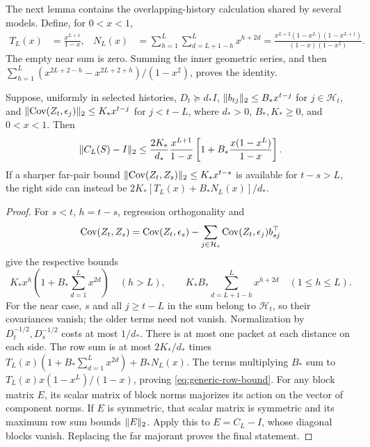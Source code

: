 The next lemma contains the overlapping-history calculation shared by
several models. Define, for $0<x<1$,
\begin{align}
 T_L(x)&=\frac{x^{L+1}}{1-x},&
 N_L(x)&=\sum_{h=1}^L\sum_{d=L+1-h}^L x^{h+2d}
 =\frac{x^{L+2}(1-x^L)(1-x^{L+1})}{(1-x)(1-x^2)}.
 \label{eq:tail-near}
\end{align}
The empty near sum is zero. Summing the inner geometric series, and then
$\sum_{h=1}^L(x^{2L+2-h}-x^{2L+2+h})/(1-x^2)$, proves the identity.

\begin{lemma}
\label{lem:local-row}
Suppose, uniformly in selected histories,
$D_t\succeq d_* I$, $\lVert b_{tj}\rVert_2\le B_*x^{t-j}$ for
$j\in\mathcal H_t$, and
$\lVert\operatorname{Cov}(Z_t,\epsilon_j)\rVert_2\le K_*x^{t-j}$ for $j<t-L$,
where $d_*>0$, $B_*,K_*\ge0$, and $0<x<1$. Then
\begin{equation}
 \lVert C_L(S)-I\rVert_2\le
 \frac{2K_*}{d_*}\frac{x^{L+1}}{1-x}
 \left[1+B_*\frac{x(1-x^L)}{1-x}\right].
 \label{eq:generic-row-bound}
\end{equation}
If a sharper far-pair bound
$\lVert\operatorname{Cov}(Z_t,Z_s)\rVert_2\le K_*x^{t-s}$ is available for $t-s>L$,
the right side can instead be
$2K_*[T_L(x)+B_*N_L(x)]/d_*$.
\end{lemma}
\begin{proof}
For $s<t$, $h=t-s$, regression orthogonality and
\begin{equation}
 \operatorname{Cov}(Z_t,Z_s)=\operatorname{Cov}(Z_t,\epsilon_s)
 -\sum_{j\in\mathcal H_s}\operatorname{Cov}(Z_t,\epsilon_j)b_{sj}^\top
 \label{eq:residual-pair-identity}
\end{equation}
give the respective bounds
\[
 K_*x^h\left(1+B_*\sum_{d=1}^Lx^{2d}\right)\quad(h>L),\qquad
 K_*B_*\sum_{d=L+1-h}^Lx^{h+2d}\quad(1\le h\le L).
\]
For the near case, $s$ and all $j\ge t-L$ in the sum belong to
$\mathcal H_t$, so their covariances vanish; the older terms need not vanish.
Normalization by $D_t^{-1/2},D_s^{-1/2}$ costs at most $1/d_*$.
There is at most one packet at each distance on each side. The row sum is
at most $2K_*/d_*$ times
$T_L(x)(1+B_*\sum_{d=1}^Lx^{2d})+B_*N_L(x)$.
The terms multiplying $B_*$ sum to
$T_L(x)x(1-x^L)/(1-x)$, proving \eqref{eq:generic-row-bound}.
For any block matrix $E$, its scalar matrix of block norms majorizes
its action on the vector of component norms. If $E$ is symmetric, that
scalar matrix is symmetric and its maximum row sum bounds $\lVert E\rVert_2$.
Apply this to $E=C_L-I$, whose diagonal blocks vanish. Replacing the far
majorant proves the final statement.
\end{proof}

